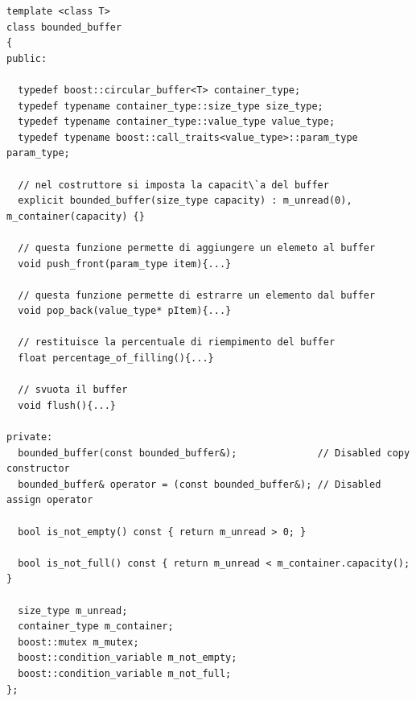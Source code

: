 \documentclass[10pt,a4paper]{article}
\begin{document}
\begin{lstlisting}[style=mycpp, caption=classe bounded\_buffer, captionpos=b, label={lst:FIFO}]
template <class T>
class bounded_buffer
{
public:

  typedef boost::circular_buffer<T> container_type;
  typedef typename container_type::size_type size_type;
  typedef typename container_type::value_type value_type;
  typedef typename boost::call_traits<value_type>::param_type param_type;

  // nel costruttore si imposta la capacit\`a del buffer
  explicit bounded_buffer(size_type capacity) : m_unread(0), m_container(capacity) {}

  // questa funzione permette di aggiungere un elemeto al buffer
  void push_front(param_type item){...}

  // questa funzione permette di estrarre un elemento dal buffer 
  void pop_back(value_type* pItem){...}

  // restituisce la percentuale di riempimento del buffer
  float percentage_of_filling(){...}

  // svuota il buffer
  void flush(){...}

private:
  bounded_buffer(const bounded_buffer&);              // Disabled copy constructor
  bounded_buffer& operator = (const bounded_buffer&); // Disabled assign operator

  bool is_not_empty() const { return m_unread > 0; }

  bool is_not_full() const { return m_unread < m_container.capacity(); }

  size_type m_unread;
  container_type m_container;
  boost::mutex m_mutex;
  boost::condition_variable m_not_empty;
  boost::condition_variable m_not_full;
};
\end{lstlisting}
\end{document}

